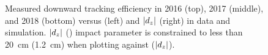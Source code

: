 \begin{figure}
\caption{Measured downward tracking efficiency in 2016 (top), 2017 (middle), and 2018 (bottom) versus \ad (left) and $\lvert d_z \rvert$ (right) in data and simulation. $\lvert d_z \rvert$ (\ad) impact parameter is constrained to less than \SI{20}{\cm} (\SI{1.2}{\cm}) when plotting against \ad ($\lvert d_z \rvert$).}
\label{displaced_trk_eff_vs_d0dz}
\end{figure}